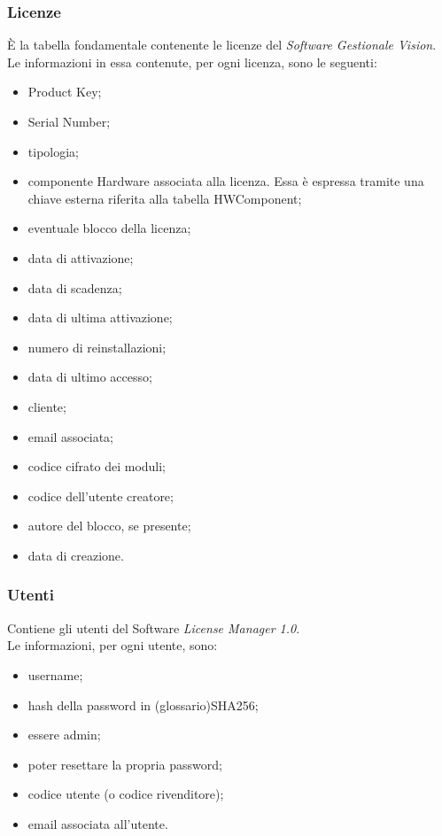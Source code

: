 \subsubsection{Licenze}
È la tabella fondamentale contenente le licenze del \textit{Software Gestionale Vision}. \\Le informazioni in essa contenute, per ogni licenza, sono le seguenti:

\begin{itemize}
\item Product Key;
\item Serial Number;
\item tipologia;
\item componente Hardware associata alla licenza. Essa è espressa tramite una chiave esterna riferita alla tabella HWComponent;
\item eventuale blocco della licenza;
\item data di attivazione;
\item data di scadenza;
\item data di ultima attivazione;
\item numero di reinstallazioni;
\item data di ultimo accesso;
\item cliente;
\item email associata;
\item codice cifrato dei moduli;
\item codice dell'utente creatore;
\item autore del blocco, se presente;
\item data di creazione.
\end{itemize}

\subsubsection{Utenti}

Contiene gli utenti del Software \textit{License Manager 1.0}.\\ Le informazioni, per ogni utente, sono:

\begin{itemize}
\item username;
\item hash della password in (glossario)SHA256;
\item essere admin;
\item poter resettare la propria password;
\item codice utente (o codice rivenditore);
\item email associata all'utente.
\end{itemize} 

